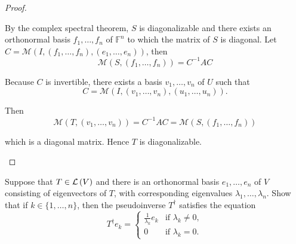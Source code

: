 \begin{proof}
\begin{enumerate}[label={(\alph*)}]
              By the complex spectral theorem, $S$ is diagonalizable and there exists an orthonormal basis $f_{1}, \ldots, f_{n}$ of $\mathbb{F}^{n}$ to which the matrix of $S$ is diagonal. Let $C = \mathcal{M}(I, (f_{1}, \ldots, f_{n}), (e_{1}, \ldots, e_{n}))$, then
              \[
                  \mathcal{M}(S, (f_{1},\ldots, f_{n})) = C^{-1}AC
              \]

              Because $C$ is invertible, there exists a basis $v_{1}, \ldots, v_{n}$ of $U$ such that
              \[
                  C = \mathcal{M}(I, (v_{1}, \ldots, v_{n}), (u_{1}, \ldots, u_{n})).
              \]

              Then
              \[
                  \mathcal{M}(T, (v_{1}, \ldots, v_{n})) = C^{-1}AC = \mathcal{M}(S, (f_{1},\ldots, f_{n}))
              \]

              which is a diagonal matrix. Hence $T$ is diagonalizable.
    \end{enumerate}
\end{proof}
\newpage

\begin{exercise}
    Suppose that $T \in \mathcal{L}\left({V}\right)$ and there is an orthonormal basis $e_{1}, \ldots, e_{n}$ of $V$ consisting of eigenvectors of $T$, with corresponding eigenvalues $\lambda_{1}, \ldots, \lambda_{n}$. Show that if $k \in \{1, \ldots, n\}$, then the pseudoinverse $T^{\dagger}$ satisfies the equation
    \[
        T^{\dagger}e_{k} = \begin{cases}
            \frac{1}{\lambda_{k}}e_{k} & \text{if $\lambda_{k}\ne 0$}, \\
            0                          & \text{if $\lambda_{k} = 0$}.
        \end{cases}
    \]
\end{exercise}

